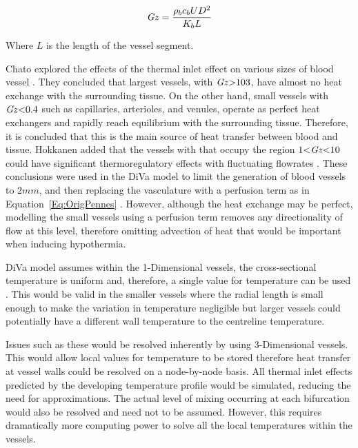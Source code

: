 \documentclass[11pt,english,a4paper,twoside,openright]{report}
\newcommand\Graetz{\mbox{\textit{Gz}}}
\begin{document}
{{{{{{{{	\begin{equation}
	\Graetz = \frac{\rho_{b}c_{b}UD^{2}}{K_{b}L}
	\label{Eq:1GraetzNumber}	
	\end{equation} 
	
	Where $L$ is the length of the vessel segment. 
	
	Chato explored the effects of the thermal inlet effect on various sizes of blood vessel \cite{chato1980heat}. They concluded that largest vessels, with $\Graetz{>}103$, have almost no heat exchange with the surrounding tissue. On the other hand, small vessels with $\Graetz{<}0.4$ such as capillaries, arterioles, and venules, operate as perfect heat exchangers and rapidly reach equilibrium with the surrounding tissue. Therefore, it is concluded that this is the main source of heat transfer between blood and tissue. Hokkanen added that the vessels with that occupy the region $1{<}\Graetz{<}10$ could have significant thermoregulatory effects with fluctuating flowrates \cite{hokkanen1997thermal}. These conclusions were used in the DiVa model to limit the generation of blood vessels to $2mm$, and then replacing the vasculature with a perfusion term as in Equation~\ref{Eq:OrigPennes} \cite{van2000numerical}. However, although the heat exchange may be perfect, modelling the small vessels using a perfusion term removes any directionality of flow at this level, therefore omitting advection of heat that would be important when inducing hypothermia. 
	
	DiVa model assumes within the 1-Dimensional vessels, the cross-sectional temperature is uniform and, therefore, a single value for temperature can be used \cite{kotte1996description}. This would be valid in the smaller vessels where the radial length is small enough to make the variation in temperature negligible but larger vessels could potentially have a different wall temperature to the centreline temperature. 
	
	Issues such as these would be resolved inherently by using 3-Dimensional vessels. This would allow local values for temperature to be stored therefore heat transfer at vessel walls could be resolved on a node-by-node basis. All thermal inlet effects predicted by the developing temperature profile would be simulated, reducing the need for approximations. The actual level of mixing occurring at each bifurcation would also be resolved and need not to be assumed. However, this requires dramatically more computing power to solve all the local temperatures within the vessels.
	
}}}}}}}}
\end{document}

